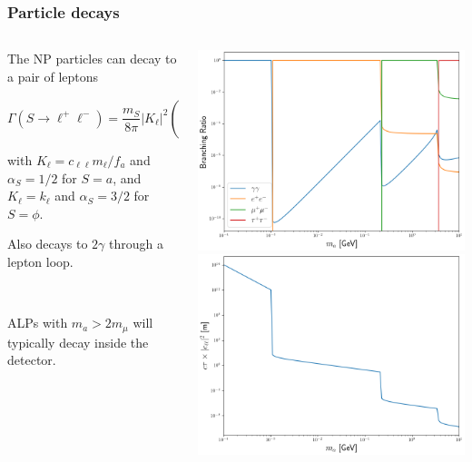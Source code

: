 \documentclass[mathserif, 10pt, aspectratio=169]{beamer}
\begin{document}
\begin{frame}\frametitle{Particle decays}
    
    \begin{columns}

        \begin{column}{0.6\textwidth}
            The NP particles can decay to a pair of leptons

            $$\Gamma(S \to \ell^+\ell^-) = \frac{m_S}{8\pi} |K_\ell|^2 \left(1-\frac{4 m_\ell^2}{m_S^2}\right)^{\alpha_S}\,,$$

            {\small with $K_\ell = c_{\ell\ell} m_\ell/f_a$ and $\alpha_S = 1/2$ for $S=a$, and $K_\ell = k_\ell$ and $\alpha_S = 3/2$ for $S=\phi$.}

            Also decays to $2\gamma$ through a lepton loop.

            ~

            ALPs with $m_a > 2 m_\mu$ will typically decay inside the detector.
        \end{column}
        \begin{column}{0.36\textwidth}
            \includegraphics[width=\columnwidth]{figures/BR.png} \\
            \includegraphics[width=\columnwidth]{figures/decaylength.png}
        \end{column}
    \end{columns}
\end{frame}
\end{document}
